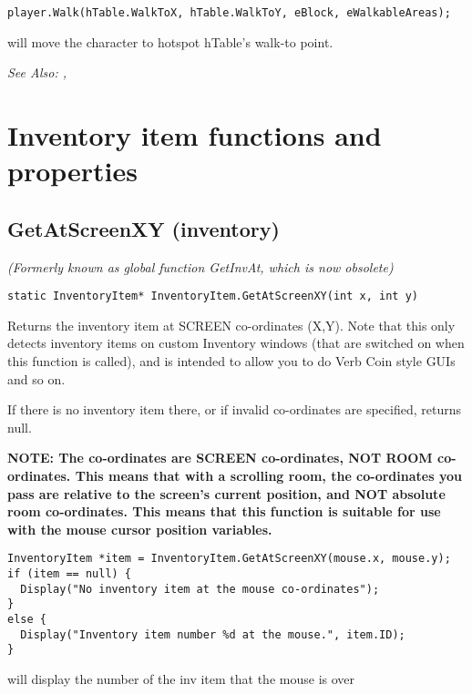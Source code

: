 \begin{verbatim}
player.Walk(hTable.WalkToX, hTable.WalkToY, eBlock, eWalkableAreas);
\end{verbatim}
will move the character to hotspot hTable's walk-to point.

\it{See Also:} ,



\section{Inventory item functions and properties}%


\subsection{GetAtScreenXY (inventory)}\label{InventoryItem.GetAtScreenXY}%

\it{(Formerly known as global function GetInvAt, which is now obsolete)}

\begin{verbatim}
static InventoryItem* InventoryItem.GetAtScreenXY(int x, int y)
\end{verbatim}
Returns the inventory item at SCREEN co-ordinates (X,Y). Note that this
only detects inventory items on custom Inventory windows (that are switched on when
this function is called), and is intended to allow you to do Verb Coin style GUIs and so on.

If there is no inventory item there, or if invalid co-ordinates are specified,
returns null.

\bf{NOTE:} The co-ordinates are SCREEN co-ordinates, NOT ROOM co-ordinates. This
means that with a scrolling room, the co-ordinates you pass are relative to
the screen's current position, and NOT absolute room co-ordinates. This
means that this function is suitable for use with the mouse cursor position
variables.

\begin{verbatim}
InventoryItem *item = InventoryItem.GetAtScreenXY(mouse.x, mouse.y);
if (item == null) {
  Display("No inventory item at the mouse co-ordinates");
}
else {
  Display("Inventory item number %d at the mouse.", item.ID);
}
\end{verbatim}
will display the number of the inv item that the mouse is over

